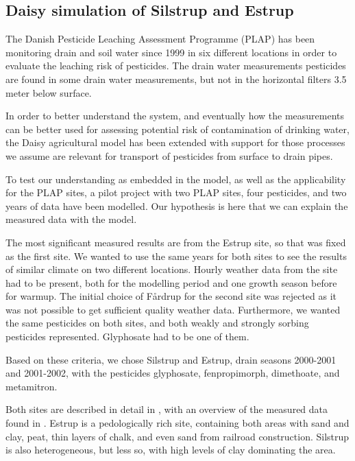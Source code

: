 \documentclass[a4paper]{article}
\begin{document}
\begin{text}

\section*{Daisy simulation of Silstrup and Estrup}

The Danish Pesticide Leaching Assessment Programme (PLAP) has been
monitoring drain and soil water since 1999 in six different locations
in order to evaluate the leaching risk of pesticides.  The drain water
measurements pesticides are found in some drain water measurements,
but not in the horizontal filters 3.5 meter below surface.

In order to better understand the system, and eventually how the
measurements can be better used for assessing potential risk of
contamination of drinking water, the Daisy agricultural model has been
extended with support for those processes we assume are relevant for
transport of pesticides from surface to drain pipes.

To test our understanding as embedded in the model, as well as the
applicability for the PLAP sites, a pilot project with two PLAP sites,
four pesticides, and two years of data have been modelled.  Our
hypothesis is here that we can explain the measured data with the
model.

The most significant measured results are from the Estrup site, so
that was fixed as the first site.  We wanted to use the same years for
both sites to see the results of similar climate on two different
locations.  Hourly weather data from the site had to be present, both
for the modelling period and one growth season before for warmup.  The
initial choice of F{\aa}rdrup for the second site was rejected as it
was not possible to get sufficient quality weather data.  Furthermore,
we wanted the same pesticides on both sites, and both weakly and
strongly sorbing pesticides represented.  Glyphosate had to be one of
them.

Based on these criteria, we chose Silstrup and Estrup, drain seasons
2000-2001 and 2001-2002, with the pesticides glyphosate, fenpropimorph,
dimethoate, and metamitron.

Both sites are described in detail in \citet{lindhardt2001}, with an
overview of the measured data found in \citet{vap2009}.  Estrup is a
pedologically rich site, containing both areas with sand and clay,
peat, thin layers of chalk, and even sand from railroad construction.
Silstrup is also heterogeneous, but less so, with high levels of clay
dominating the area.


\end{text}
\end{document}
